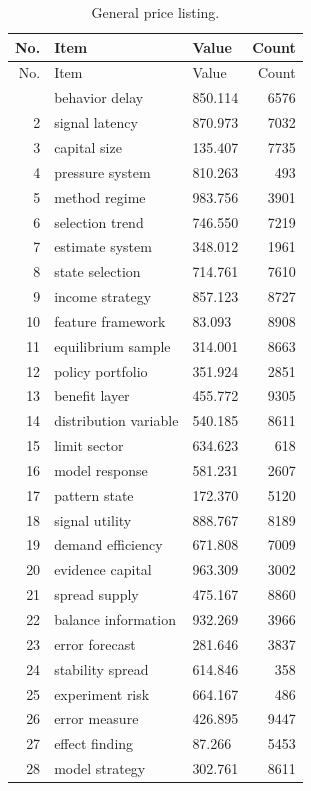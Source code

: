 \documentclass[11pt]{report}
\begin{document}
\begin{longtable}{rllr}\caption{General price listing.}\label{tab:l1}\\\toprule No. & Item & Value & Count \\ \midrule \endfirsthead\toprule No. & Item & Value & Count \\ \midrule \endhead\bottomrule \endfoot
1 & behavior delay & 850.114 & 6576 \\
2 & signal latency & 870.973 & 7032 \\
3 & capital size & 135.407 & 7735 \\
4 & pressure system & 810.263 & 493 \\
5 & method regime & 983.756 & 3901 \\
6 & selection trend & 746.550 & 7219 \\
7 & estimate system & 348.012 & 1961 \\
8 & state selection & 714.761 & 7610 \\
9 & income strategy & 857.123 & 8727 \\
10 & feature framework & 83.093 & 8908 \\
11 & equilibrium sample & 314.001 & 8663 \\
12 & policy portfolio & 351.924 & 2851 \\
13 & benefit layer & 455.772 & 9305 \\
14 & distribution variable & 540.185 & 8611 \\
15 & limit sector & 634.623 & 618 \\
16 & model response & 581.231 & 2607 \\
17 & pattern state & 172.370 & 5120 \\
18 & signal utility & 888.767 & 8189 \\
19 & demand efficiency & 671.808 & 7009 \\
20 & evidence capital & 963.309 & 3002 \\
21 & spread supply & 475.167 & 8860 \\
22 & balance information & 932.269 & 3966 \\
23 & error forecast & 281.646 & 3837 \\
24 & stability spread & 614.846 & 358 \\
25 & experiment risk & 664.167 & 486 \\
26 & error measure & 426.895 & 9447 \\
27 & effect finding & 87.266 & 5453 \\
28 & model strategy & 302.761 & 8611 \\

\end{longtable}
\end{document}
